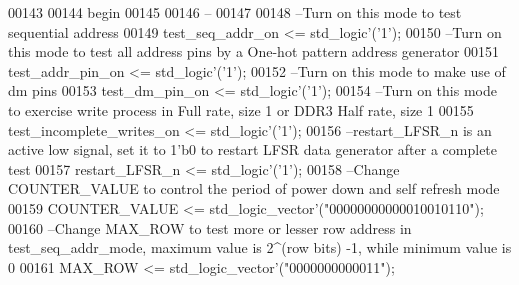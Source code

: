 \begin{DoxyCode}
00143 
00144 \textcolor{vhdlkeyword}{begin}
00145 
00146 \textcolor{keyword}{  --}
00147 
00148 \textcolor{keyword}{  --Turn on this mode to test sequential address}
00149   \textcolor{vhdlchar}{test_seq_addr_on} \textcolor{vhdlchar}{<=} \textcolor{comment}{std\_logic}\textcolor{vhdlchar}{'}\textcolor{vhdlchar}{(}\textcolor{vhdlchar}{'}\textcolor{vhdllogic}{}\textcolor{vhdllogic}{1}\textcolor{vhdlchar}{'}\textcolor{vhdlchar}{)};
00150 \textcolor{keyword}{  --Turn on this mode to test all address pins by a One-hot pattern address generator}
00151   \textcolor{vhdlchar}{test_addr_pin_on} \textcolor{vhdlchar}{<=} \textcolor{comment}{std\_logic}\textcolor{vhdlchar}{'}\textcolor{vhdlchar}{(}\textcolor{vhdlchar}{'}\textcolor{vhdllogic}{}\textcolor{vhdllogic}{1}\textcolor{vhdlchar}{'}\textcolor{vhdlchar}{)};
00152 \textcolor{keyword}{  --Turn on this mode to make use of dm pins}
00153   \textcolor{vhdlchar}{test_dm_pin_on} \textcolor{vhdlchar}{<=} \textcolor{comment}{std\_logic}\textcolor{vhdlchar}{'}\textcolor{vhdlchar}{(}\textcolor{vhdlchar}{'}\textcolor{vhdllogic}{}\textcolor{vhdllogic}{1}\textcolor{vhdlchar}{'}\textcolor{vhdlchar}{)};
00154 \textcolor{keyword}{  --Turn on this mode to exercise write process in Full rate, size 1 or DDR3 Half rate, size 1}
00155   \textcolor{vhdlchar}{test_incomplete_writes_on} \textcolor{vhdlchar}{<=} \textcolor{comment}{std\_logic}\textcolor{vhdlchar}{'}\textcolor{vhdlchar}{(}\textcolor{vhdlchar}{'}\textcolor{vhdllogic}{}\textcolor{vhdllogic}{1}\textcolor{vhdlchar}{'}\textcolor{vhdlchar}{)};
00156 \textcolor{keyword}{  --restart\_LFSR\_n is an active low signal, set it to 1'b0 to restart LFSR data generator after a complete
       test}
00157   \textcolor{vhdlchar}{restart_LFSR_n} \textcolor{vhdlchar}{<=} \textcolor{comment}{std\_logic}\textcolor{vhdlchar}{'}\textcolor{vhdlchar}{(}\textcolor{vhdlchar}{'}\textcolor{vhdllogic}{}\textcolor{vhdllogic}{1}\textcolor{vhdlchar}{'}\textcolor{vhdlchar}{)};
00158 \textcolor{keyword}{  --Change COUNTER\_VALUE to control the period of power down and self refresh mode}
00159   \textcolor{vhdlchar}{COUNTER_VALUE} \textcolor{vhdlchar}{<=} \textcolor{comment}{std\_logic\_vector}\textcolor{vhdlchar}{'}\textcolor{vhdlchar}{(}\textcolor{vhdllogic}{"00000000000010010110"}\textcolor{vhdlchar}{)};
00160 \textcolor{keyword}{  --Change MAX\_ROW to test more or lesser row address in test\_seq\_addr\_mode, maximum value is 2^(row bits)
       -1, while minimum value is 0}
00161   \textcolor{vhdlchar}{MAX_ROW} \textcolor{vhdlchar}{<=} \textcolor{comment}{std\_logic\_vector}\textcolor{vhdlchar}{'}\textcolor{vhdlchar}{(}\textcolor{vhdllogic}{"0000000000011"}\textcolor{vhdlchar}{)};

\end{DoxyCode}
